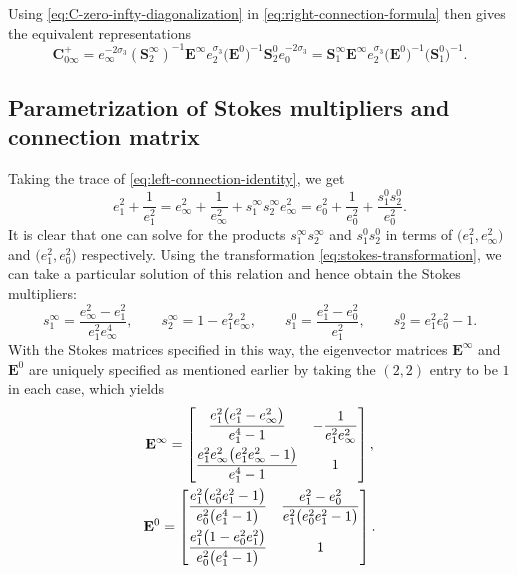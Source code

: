  Using \eqref{eq:C-zero-infty-diagonalization} in \eqref{eq:right-connection-formula} then gives the equivalent representations
 \begin{equation}
 \mathbf{C}_{0\infty}^+
 =e_\infty^{-2\sigma_3}(\mathbf{S}_{2}^\infty )^{-1}\mathbf{E}^\infty e_2^{\sigma_3}\big(\mathbf{E}^0\big)^{-1}\mathbf{S}^0_{2}e_0^{-2\sigma_3}
 =\mathbf{S}_{1}^\infty \mathbf{E}^\infty e_2^{\sigma_3}\big(\mathbf{E}^0\big)^{-1}\big(\mathbf{S}^0_{1}\big)^{-1}.
 \label{eq:C-zero-infty-plus-diagonalization}
 \end{equation}

 \subsection{Parametrization of Stokes multipliers and connection matrix}
 Taking the trace of \eqref{eq:left-connection-identity}, we get
\begin{equation*}
e_1^2+\frac{1}{e_1^2}=e_\infty^2+\frac1{e_\infty^2}+{s^\infty_1 s^\infty_2}{e_\infty^2}=e_0^2+\frac1{e_0^2}+\frac{s^0_1s^0_2}{e_0^2}.
\end{equation*}
It is clear that one can solve for the products $s^\infty_1s^\infty_2$ and $s_1^0s_2^0$ in terms of $\big(e_1^2,e_\infty^2\big)$ and $\big(e_1^2,e_0^2\big)$ respectively. Using the transformation \eqref{eq:stokes-transformation}, we can take a particular solution of this relation and hence obtain the Stokes multipliers:
\begin{equation}
\label{eq:stokes-parameters}
 s^\infty_1=\frac{e_\infty^2-e_1^2}{e_1^2e_\infty^4},\qquad s^\infty_2=1-e_1^2e_\infty^2,\qquad s^0_1=\frac{e_1^2-e_0^2}{e_1^2},\qquad s^0_2={e_1^2e_0^2 - 1}.
\end{equation}
With the Stokes matrices specified in this way, the eigenvector matrices $\mathbf{E}^\infty$ and $\mathbf{E}^0$ are uniquely specified as mentioned earlier by taking the $(2,2)$ entry to be $1$ in each case, which yields
\begin{gather}
\mathbf{E}^{\infty}=\left[
\begin{matrix}
 \dfrac{e_1^2 \big(e_1^2-e_\infty^2\big)}{e_1^4-1} & -\dfrac{1}{e_1^2e_\infty^2} \vspace{1mm} \\
 \dfrac{e_1^2 e_\infty^2\big(e_1^2 e_\infty^2-1\big)}{e_1^4-1} & 1
\end{matrix}
\right],\label{eq:E-infinity-formula}\\
\mathbf{E}^{0}=\left[
\begin{matrix}
 \dfrac{e_1^2 \big(e_0^2 e_1^2-1\big)}{e_0^2 \big(e_1^4-1\big)} & \dfrac{e_1^2-e_0^2}{e_1^2 \big(e_0^2 e_1^2-1\big)} \vspace{1mm}\\
 \dfrac{e_1^2 \big(1 - e_0^2 e_1^2\big)}{e_0^2 \big(e_1^4-1\big)} & 1
\end{matrix}
\right].\label{eq:E-zero-formula}
\end{gather}
